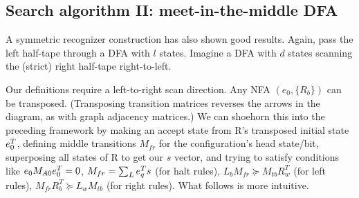 \subsection{Search algorithm II: meet-in-the-middle DFA}
\label{far-algo-mtim_dfa}
A symmetric recognizer construction has also shown good results.
Again, pass the left half-tape through a DFA with $l$ states.
Imagine a DFA with $d$ states scanning the (strict) right half-tape right-to-left.

\begin{remark}
  Our definitions require a left-to-right scan direction.
  Any NFA $(e_0, \{R_b\})$ can be transposed.
  (Transposing transition matrices reverses the arrows in the diagram, as with graph adjacency matrices.)
  We can shoehorn this into the preceding framework by making an accept state from R's transposed initial state $e_0^T$,
  defining middle transitions $M_{fr}$ for the configuration's head state/bit,
  superposing all states of R to get our $s$ vector,
  and trying to satisfy conditions like
  $e_0 M_{A0} e_0^T = 0$, $M_{fr}=\sum_L e_q^T s$ (for halt rules),
  $L_b M_{fr} \succeq M_{tb} R^T_w$ (for left rules),
  $M_{fr} R^T_b \succeq L_w M_{tb}$ (for right rules).
  What follows is more intuitive.
\end{remark}

